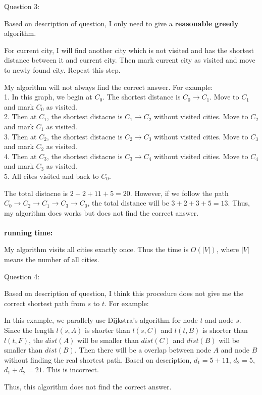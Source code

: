 \documentclass[12pt]{article}
\begin{document}
\pagebreak
\noindent
\large Question 3: \vspace{5mm} \par
\normalsize 
\setlength{\baselineskip}{8mm}
Based on description of question, I only need to give a \textbf{reasonable greedy} algorithm. \par
For current city, I will find another city which is not visited and has the shortest distance between it and current city.
Then mark current city as visited and move to newly found city.
Repeat this step. \par
My algorithm will not always find the correct answer. For example: \\

1. In this graph, we begin at $C_0$. The shortest distance is $C_0 \rightarrow C_1$. Move to $C_1$ and mark $C_0$ as visited. \\
2. Then at $C_1$, the shortest distacne is $C_1 \rightarrow C_2$ without visited cities. Move to $C_2$ and mark $C_1$ as visited. \\
3. Then at $C_2$, the shortest distacne is $C_2 \rightarrow C_3$ without visited cities. Move to $C_3$ and mark $C_2$ as visited. \\
4. Then at $C_3$, the shortest distacne is $C_3 \rightarrow C_4$ without visited cities. Move to $C_4$ and mark $C_3$ as visited. \\
5. All cites visited and back to $C_0$. \par
The total distacne is $2+2+11+5 = 20$.
However, if we follow the path $C_0 \rightarrow C_2 \rightarrow C_1 \rightarrow C_3 \rightarrow C_0$, the total distance will be $3+2+3+5=13$.
Thus, my algorithm does works but does not find the correct answer. \\
\noindent \\
\textbf{running time:} \par
My algorithm visits all cities exactly once. Thus the time is $O(|V|)$, where $|V|$ means the number of all cities.


\pagebreak
\noindent
\large Question 4: \par
\normalsize 
\setlength{\baselineskip}{8mm}
Based on description of question, I think this procedure does not give me the correct shortest path from $s$ to $t$.
For example: \\
 \par
In this example, we parallely use Dijkstra’s algorithm for node $t$ and node $s$. 
Since the length $l(s, A)$ is shorter than $l(s, C)$ and $l(t, B)$ is shorter than $l(t, F)$, the $dist(A)$ will be smaller than $dist(C)$ and $dist(B)$ will be smaller than $dist(B)$.
Then there will be a overlap between node $A$ and node $B$ without finding the real shortest path. 
Based on description, $d_1 = 5 + 11$, $d_2 = 5$, $d_1 + d_2 = 21$. This is incorrect. \par
Thus, this algorithm does not find the correct answer. \\
\end{document}
